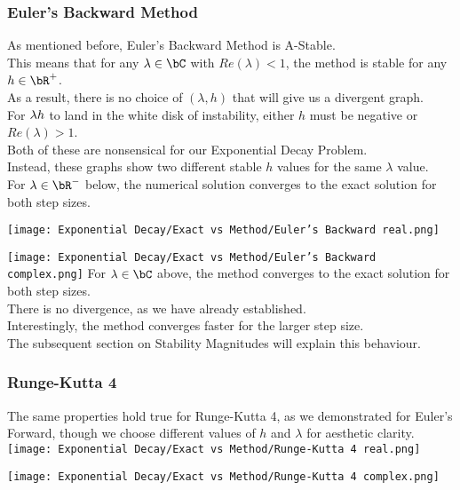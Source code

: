 \subsubsection{Euler's Backward Method}
\begin{multicols}{2}
	As mentioned before, Euler's Backward Method is A-Stable.\\
	This means that for any $\lambda \in \bC$ with $Re(\lambda) < 1$, the method is stable for any $h \in \bR^{+}$.\\
	As a result, there is no choice of $(\lambda, h)$ that will give us a divergent graph.\\
	For $\lambda h$ to land in the white disk of instability, either $h$ must be negative or $Re(\lambda) > 1$.\\
	Both of these are nonsensical for our Exponential Decay Problem.\\
	Instead, these graphs show two different stable $h$ values for the same $\lambda$ value.\\
	For $\lambda \in \bR^{-}$ below, the numerical solution converges to the exact solution for both step sizes.\\
	\begin{center}
	\texttt{[image: Exponential Decay/Exact vs Method/Euler's Backward real.png]}
	\end{center}
	\columnbreak{}
	\vspace*{-1.5cm}
	\texttt{[image: Exponential Decay/Exact vs Method/Euler's Backward complex.png]}
	For $\lambda \in \bC$ above, the method converges to the exact solution for both step sizes.\\
	There is no divergence, as we have already established.\\
	Interestingly, the method converges faster for the larger step size.\\
	The subsequent section on Stability Magnitudes will explain this behaviour.
\end{multicols}
\newpage
\subsubsection{Runge-Kutta 4}
\begin{multicols}{2}
	The same properties hold true for Runge-Kutta 4, as we demonstrated for Euler's Forward, though we choose different values of $h$ and $\lambda$ for aesthetic clarity.\\
	\vspace*{2cm}
	\texttt{[image: Exponential Decay/Exact vs Method/Runge-Kutta 4 real.png]}
\columnbreak{}
\begin{center}
	\texttt{[image: Exponential Decay/Exact vs Method/Runge-Kutta 4 complex.png]}
\end{center}
\end{multicols}
\newpage
